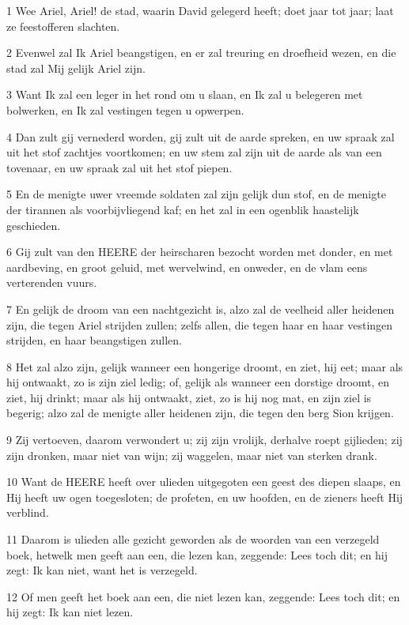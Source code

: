 \par 1 Wee Ariel, Ariel! de stad, waarin David gelegerd heeft; doet jaar tot jaar; laat ze feestofferen slachten.
\par 2 Evenwel zal Ik Ariel beangstigen, en er zal treuring en droefheid wezen, en die stad zal Mij gelijk Ariel zijn.
\par 3 Want Ik zal een leger in het rond om u slaan, en Ik zal u belegeren met bolwerken, en Ik zal vestingen tegen u opwerpen.
\par 4 Dan zult gij vernederd worden, gij zult uit de aarde spreken, en uw spraak zal uit het stof zachtjes voortkomen; en uw stem zal zijn uit de aarde als van een tovenaar, en uw spraak zal uit het stof piepen.
\par 5 En de menigte uwer vreemde soldaten zal zijn gelijk dun stof, en de menigte der tirannen als voorbijvliegend kaf; en het zal in een ogenblik haastelijk geschieden.
\par 6 Gij zult van den HEERE der heirscharen bezocht worden met donder, en met aardbeving, en groot geluid, met wervelwind, en onweder, en de vlam eens verterenden vuurs.
\par 7 En gelijk de droom van een nachtgezicht is, alzo zal de veelheid aller heidenen zijn, die tegen Ariel strijden zullen; zelfs allen, die tegen haar en haar vestingen strijden, en haar beangstigen zullen.
\par 8 Het zal alzo zijn, gelijk wanneer een hongerige droomt, en ziet, hij eet; maar als hij ontwaakt, zo is zijn ziel ledig; of, gelijk als wanneer een dorstige droomt, en ziet, hij drinkt; maar als hij ontwaakt, ziet, zo is hij nog mat, en zijn ziel is begerig; alzo zal de menigte aller heidenen zijn, die tegen den berg Sion krijgen.
\par 9 Zij vertoeven, daarom verwondert u; zij zijn vrolijk, derhalve roept gijlieden; zij zijn dronken, maar niet van wijn; zij waggelen, maar niet van sterken drank.
\par 10 Want de HEERE heeft over ulieden uitgegoten een geest des diepen slaaps, en Hij heeft uw ogen toegesloten; de profeten, en uw hoofden, en de zieners heeft Hij verblind.
\par 11 Daarom is ulieden alle gezicht geworden als de woorden van een verzegeld boek, hetwelk men geeft aan een, die lezen kan, zeggende: Lees toch dit; en hij zegt: Ik kan niet, want het is verzegeld.
\par 12 Of men geeft het boek aan een, die niet lezen kan, zeggende: Lees toch dit; en hij zegt: Ik kan niet lezen.
